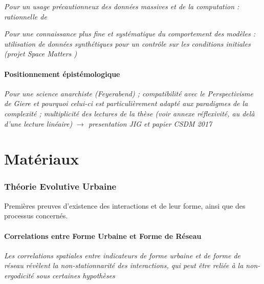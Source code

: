 \textit{Pour un usage précautionneux des données massives et de la computation : rationnelle de~\cite{raimbault2016cautious}}

\textit{Pour une connaissance plus fine et systématique du comportement des modèles : utilisation de données synthétiques pour un contrôle sur les conditions initiales (projet Space Matters \cite{cottineau2015revisiting})}



\subsection{Positionnement épistémologique}

\textit{Pour une science anarchiste (Feyerabend) ; compatibilité avec le Perspectivisme de Giere et pourquoi celui-ci est particulièrement adapté aux paradigmes de la complexité ; multiplicité des lectures de la thèse (voir annexe réflexivité, au delà d'une lecture linéaire) $\rightarrow$ presentation JIG et papier CSDM 2017}














\part{Matériaux}



\section{Théorie Evolutive Urbaine}

{\color{blue}Premières preuves d'existence des interactions et de leur forme, ainsi que des processus concernés.}

\subsection{Correlations entre Forme Urbaine et Forme de Réseau}

\textit{Les correlations spatiales entre indicateurs de forme urbaine et de forme de réseau révèlent la non-stationnarité des interactions, qui peut être reliée à la non-ergodicité sous certaines hypothèses~\cite{raimbault2016cautious}}


